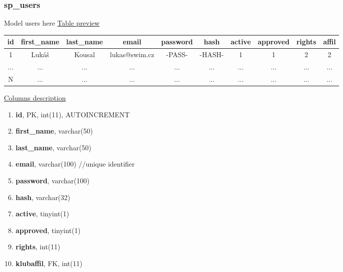\subsubsection*{sp\_users}
Model users here
\newline
\underline{Table preview}
\begin{center}
  \begin{tabular}{||c c c c c c c c c c||} 
  \hline
  id & first\_name & last\_name & email & password & hash & active & approved & rights & affil \\ [0.5ex] 
  \hline\hline
  1 & Lukáš & Kousal & lukas@swim.cz & -PASS- & -HASH- & 1 & 1 & 2 & 2 \\ 
  \hline
  ... & ... & ... & ... & ... & ... & ... & ... & ... & ... \\
  \hline
  N & ... & ... & ... & ... & ... & ... & ... & ... & ... \\ [1ex] 
  \hline
 \end{tabular}
 \end{center}
 \underline{Columns description}
 \begin{enumerate}
   \setlength\itemsep{0em}
   \item \textbf{id}, PK, int(11), AUTOINCREMENT
   \item \textbf{first\_name}, varchar(50)
   \item \textbf{last\_name}, varchar(50)
   \item \textbf{email}, varchar(100) //unique identifier
   \item \textbf{password}, varchar(100)
   \item \textbf{hash}, varchar(32)
   \item \textbf{active}, tinyint(1)
   \item \textbf{approved}, tinyint(1)
   \item \textbf{rights}, int(11)
   \item \textbf{klubaffil}, FK, int(11)
\end{enumerate}

